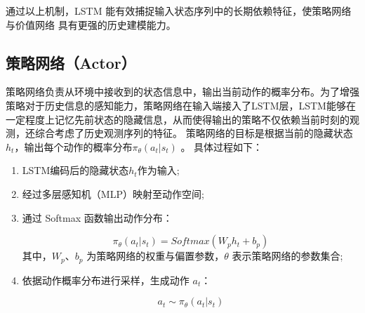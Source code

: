 通过以上机制，LSTM 能有效捕捉输入状态序列中的长期依赖特征，使策略网络与价值网络
具有更强的历史建模能力。


\subsection{策略网络（Actor）}

策略网络负责从环境中接收到的状态信息中，输出当前动作的概率分布。为了增强策略对于历史信息的感知能力，策略网络在输入端接入了LSTM层，LSTM能够在一定程度上记忆先前状态的隐藏信息，从而使得输出的策略不仅依赖当前时刻的观测，还综合考虑了历史观测序列的特征。
策略网络的目标是根据当前的隐藏状态$h_{t}$，输出每个动作的概率分布$\pi_{\theta}(a_{t}|s_{t})$ 。
具体过程如下：


\begin{enumerate} [label=\arabic*)] 

\item LSTM编码后的隐藏状态$h_{t}$作为输入;


\item 经过多层感知机（MLP）映射至动作空间;


\item 通过 Softmax 函数输出动作分布：

\begin{equation}
\pi_{\theta}(a_t | s_t) = Softmax(W_p h_t + b_p)
\tag{4.8}
\end{equation}
其中，$W_p$、$b_p$ 为策略网络的权重与偏置参数，$\theta$ 表示策略网络的参数集合;


\item 依据动作概率分布进行采样，生成动作 $a_t$：

\begin{equation}
a_t \sim \pi_\theta(a_t | s_t)
\end{equation}

\end{enumerate}

